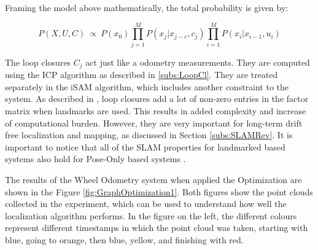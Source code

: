 \documentclass[11pt]{article}
\begin{document}
Framing the model above mathematically, the total probability is given by:

\begin{equation}
P(X,U,C)\ \propto \ P(x_0)\prod_{j=1}^{M}P(x_j|x_{j-c},c_j)\prod_{i=1}^{M}P(x_i|x_{i-1}, u_i)
\label{eq:probSLAM2}
\end{equation}
	
The loop closures $C_j$ act just like a odometry measurements. They are computed using the ICP algorithm as described in \ref{subs:LoopCl}. They are treated separately in the iSAM algorithm, which includes another constraint to the system. As described in \cite{Kaess08tro}, loop closures add a lot of non-zero entries in the factor matrix when landmarks are used. This results in added complexity and increase of computational burden. However, they are very important for long-term drift free localization and mapping, as discussed in Section \ref{subs:SLAMRev}. It is important to notice that all of the SLAM properties for landmarked based systems also hold for Pose-Only based systems \cite{Kaess08tro}.
	
The results of the Wheel Odometry system when applied the Optimization are shown in the Figure \ref{fig:GraphOptimization1}. Both figures show the  point clouds collected in the experiment, which can be used to understand how well the localization algorithm performs. In the figure on the left, the different colours represent different timestamps in which the point cloud was taken, starting with blue, going to orange, then blue, yellow, and finishing with red.
	
\end{document}

